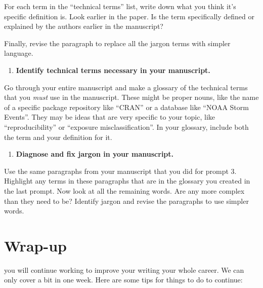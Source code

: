 \documentclass[]{tufte-book}
\providecommand{\tightlist}{%
  \setlength{\itemsep}{0pt}\setlength{\parskip}{0pt}}
\begin{document}
For each term in the ``technical terms'' list, write down what you think it's
specific definition is. Look earlier in the paper. Is the term specifically
defined or explained by the authors earlier in the manuscript?

Finally, revise the paragraph to replace all the jargon terms with simpler language.

\begin{enumerate}
\def\labelenumi{\arabic{enumi}.}
\setcounter{enumi}{5}
\tightlist
\item
  \textbf{Identify technical terms necessary in your manuscript.}
\end{enumerate}

Go through your entire manuscript and make a glossary of the technical terms
that you \emph{must} use in the manuscript. These might be proper nouns, like the
name of a specific package repository like ``CRAN'' or a database like ``NOAA Storm
Events''. They may be ideas that are very specific to your topic, like
``reproducibility'' or ``exposure misclassification''. In your glossary, include
both the term and your definition for it.

\begin{enumerate}
\def\labelenumi{\arabic{enumi}.}
\setcounter{enumi}{6}
\tightlist
\item
  \textbf{Diagnose and fix jargon in your manuscript.}
\end{enumerate}

Use the same paragraphs from your manuscript that you did for prompt 3.
Highlight any terms in these paragraphs that are in the glossary you created in
the last prompt. Now look at all the remaining words. Are any more complex than
they need to be? Identify jargon and revise the paragraphs to use simpler words.

\hypertarget{wrap-up}{%
\chapter{Wrap-up}\label{wrap-up}}

 you will continue working to improve your
writing your whole career. We can only cover a bit in one week. Here are some tips for
things to do to continue:
\end{document}
